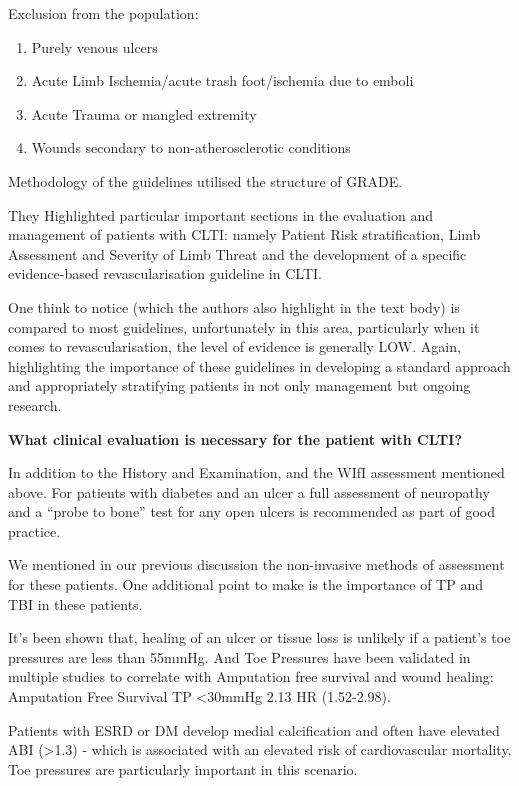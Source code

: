 \documentclass[
]{book}
\begin{document}
Exclusion from the population:

\begin{enumerate}
\def\labelenumi{\arabic{enumi}.}
\item
  Purely venous ulcers
\item
  Acute Limb Ischemia/acute trash foot/ischemia due to emboli
\item
  Acute Trauma or mangled extremity
\item
  Wounds secondary to non-atherosclerotic conditions
\end{enumerate}

Methodology of the guidelines utilised the structure of GRADE.

They Highlighted particular important sections in the evaluation and
management of patients with CLTI: namely Patient Risk stratification,
Limb Assessment and Severity of Limb Threat and the development of a
specific evidence-based revascularisation guideline in CLTI.

One think to notice (which the authors also highlight in the text body)
is compared to most guidelines, unfortunately in this area, particularly
when it comes to revascularisation, the level of evidence is generally
LOW. Again, highlighting the importance of these guidelines in
developing a standard approach and appropriately stratifying patients in
not only management but ongoing research.

\textbf{What clinical evaluation is necessary for the patient with CLTI?}

In addition to the History and Examination, and the WIfI assessment
mentioned above. For patients with diabetes and an ulcer a full
assessment of neuropathy and a ``probe to bone'' test for any open ulcers
is recommended as part of good practice.

We mentioned in our previous discussion the non-invasive methods of
assessment for these patients. One additional point to make is the
importance of TP and TBI in these patients.

It's been shown that, healing of an ulcer or tissue loss is unlikely if
a patient's toe pressures are less than 55mmHg. And Toe Pressures have
been validated in multiple studies to correlate with Amputation free
survival and wound healing: Amputation Free Survival TP \textless30mmHg 2.13 HR
(1.52-2.98). \citep{wickström2017, hicks2018}

Patients with ESRD or DM develop medial calcification and often have
elevated ABI (\textgreater1.3) - which is associated with an elevated risk of
cardiovascular mortality. Toe pressures are particularly important in
this scenario. \citep{resnick2004, vitti1994}
\end{document}
